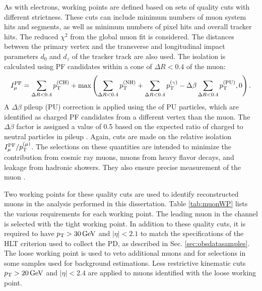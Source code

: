 As with electrons, working points are defined based on sets of quality cuts with different strictness. These cuts can include minimum numbers of muon system hits and segments, as well as minimum numbers of pixel hits and overall tracker hits. The reduced $\chi^2$ from the global muon fit is considered. The distances between the primary vertex and the transverse and longitudinal impact parameters $d_0$ and $d_z$ of the tracker track are also used. The isolation is calculated using PF candidates within a cone of $\Delta R < 0.4$ of the muon:
\begin{equation}
I^{\text{PF}}_{\mu} = \sum_{\Delta R < 0.4}{p_{\mathrm{T}}^{(\text{CH})}} + \text{max}\left( \sum_{\Delta R < 0.4}{p_{\mathrm{T}}^{(\text{NH})}} + \sum_{\Delta R < 0.4}{p_{\mathrm{T}}^{(\gamma)}} - \Delta\beta \sum_{\Delta R < 0.4}{p_{\mathrm{T}}^{(\text{PU})}}, 0 \right).
\end{equation}
A $\Delta\beta$ pileup (PU) correction is applied using the \pt of PU particles, which are identified as charged PF candidates from a different vertex than the muon. The $\Delta\beta$ factor is assigned a value of 0.5 based on the expected ratio of charged to neutral particles in pileup \cite{CMS-PAS-PFT-10-002}. Again, cuts are made on the relative isolation $I^{\text{PF}}_{\mu}/p_{\mathrm{T}}^{(\mu)}$. The selections on these quantities are intended to minimize the contribution from cosmic ray muons, muons from heavy flavor decays, and leakage from hadronic showers. They also ensure precise measurement of the muon \pt.

Two working points for these quality cuts are used to identify reconstructed muons in the analysis performed in this dissertation. Table \ref{tab:muonWP} lists the various requirements for each working point. The leading muon in the \mutau channel is selected with the tight working point. In addition to these quality cuts, it is required to have $p_{\mathrm{T}}>30\,\text{Ge\hspace{-.08em}V}$ and $|\eta|<2.1$ to match the specifications of the HLT criterion used to collect the PD, as described in Sec. \ref{sec:obsdatasamples}. The loose working point is used to veto additional muons and for selections in some samples used for background estimations. Less restrictive kinematic cuts $p_{\mathrm{T}}>20\,\text{Ge\hspace{-.08em}V}$ and $|\eta|<2.4$ are applied to muons identified with the loose working point.

